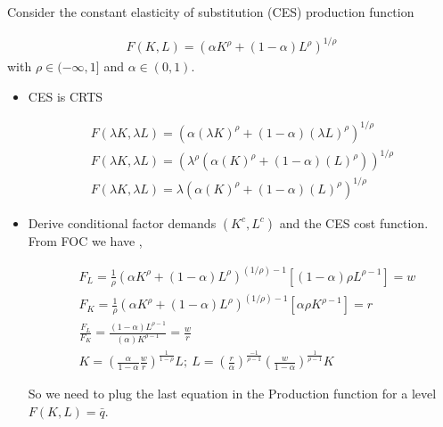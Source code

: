 

Consider the constant elasticity of substitution (CES) production function

    \begin{equation}
    \begin{aligned}
    F(K,L) = (\alpha K^{\rho} + (1-\alpha)L^{\rho})^{1/\rho}
    \end{aligned}
    \end{equation}
with $\rho \in (-\infty,1]$ and $ \alpha \in (0,1)$.

\begin{itemize}
\item 
CES is CRTS

    \begin{equation}
    \begin{aligned}
    F(\lambda K,\lambda L) = (\alpha (\lambda K)^{\rho} + (1-\alpha)(\lambda L)^{\rho})^{1/\rho} \\
    F(\lambda K,\lambda L) = (\lambda^{\rho}(\alpha (K)^{\rho} + (1-\alpha)(L)^{\rho}))^{1/\rho} \\
    F(\lambda K,\lambda L) = \lambda(\alpha (K)^{\rho} + (1-\alpha)(L)^{\rho})^{1/\rho} 
    \end{aligned}
    \end{equation}

\item 
Derive conditional factor demands $(K^{c},L^{c})$ and the CES cost function.
From FOC we have ,

    \begin{equation}
    \begin{aligned}
        & F_{L} = \frac{1}{\rho}(\alpha K^{\rho} + (1-\alpha)L^{\rho})^{(1/\rho)-1}[(1-\alpha) \rho L^{\rho-1}] = w \\
        & F_{K} = \frac{1}{\rho}(\alpha K^{\rho} + (1-\alpha)L^{\rho})^{(1/\rho)-1}[\alpha \rho K^{\rho-1}] = r \\
        & \frac{F_{L}}{F_{K}} = \frac{(1-\alpha)L^{\rho-1}}{(\alpha)K^{\rho-1}}=\frac{w}{r} \\
        & K = (\frac{\alpha}{1-\alpha}\frac{w}{r})^{\frac{1}{1-\rho}}L  ;\  
        L = (\frac{r}{\alpha})^{\frac{-1}{\rho-1}}
        (\frac{w}{1-\alpha})^{\frac{1}{\rho-1}}K
    \end{aligned}
    \end{equation}

So we need to plug the last equation in the Production function for a level $F(K,L)=\bar{q}$.


\end{itemize}
